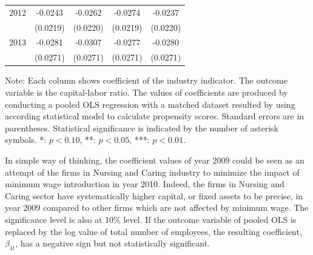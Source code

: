 \documentclass[11pt,a4paper,oneside]{article}
\begin{document}
\begin{table}[!t]
\begin{threeparttable}
\begin{tabular}{*9c}
		\multicolumn{1}{l}{2012} & \multicolumn{2}{c}{-0.0243} & \multicolumn{2}{c}{-0.0262} & \multicolumn{2}{c}{-0.0274} & \multicolumn{2}{c}{-0.0237}\\
		\multicolumn{1}{l}{} & \multicolumn{2}{c}{(0.0219)} & \multicolumn{2}{c}{(0.0220)} & \multicolumn{2}{c}{(0.0219)}& \multicolumn{2}{c}{(0.0220)}\\
		
		\multicolumn{1}{l}{2013} & \multicolumn{2}{c}{-0.0281} & \multicolumn{2}{c}{-0.0307} & \multicolumn{2}{c}{-0.0277} & \multicolumn{2}{c}{-0.0280}\\
		\multicolumn{1}{l}{} & \multicolumn{2}{c}{(0.0271)} & \multicolumn{2}{c}{(0.0271)} & \multicolumn{2}{c}{(0.0271)}& \multicolumn{2}{c}{(0.0271)}\\
		\bottomrule
	\end{tabular}
	\begin{tablenotes}
	    \linespread{1}\footnotesize
	     Note: Each column shows coefficient of the industry indicator. The outcome variable is the capital-labor ratio. The values of coefficients are produced by conducting a pooled OLS regression with a matched dataset resulted by using according statistical model to calculate propensity scores. Standard errors are in parentheses. Statistical significance is indicated by the number of asterisk symbols. *: $p<0.10$, **: $p<0.05$, ***: $p<0.01$.
	\end{tablenotes}
	\end{threeparttable}
	\label{table:7}
\end{table}

\par
In simple way of thinking, the coefficient values of year 2009 could be seen as an attempt of the firms in Nursing and Caring industry to minimize the impact of minimum wage introduction in year 2010. Indeed, the firms in Nursing and Caring sector have systematically higher capital, or fixed assets to be precise, in year 2009 compared to other firms which are not affected by minimum wage. The significance level is also at 10\% level. If the outcome variable of pooled OLS is replaced by the log value of total number of employees, the resulting coefficient, $\beta_{1t}$, has a negative sign but not statistically significant.

\end{document}
